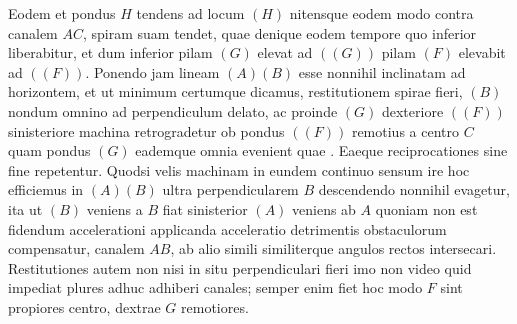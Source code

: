 \noindent {} 
\pend
\vspace{1.5em}
\pstart
Eodem
et pondus $H$ tendens ad locum $(H)$ nitensque eodem modo contra canalem $AC$, spiram suam tendet,
quae denique eodem tempore quo inferior liberabitur,
et dum inferior pilam\protect{} $(G)$ elevat ad $((G))$ pilam $(F)$ elevabit ad $((F))$.
\pend 
\pstart
Ponendo jam lineam $(A)(B)$ esse nonnihil inclinatam ad horizontem, et ut minimum certumque dicamus, restitutionem spirae fieri, $(B)$ nondum omnino ad perpendiculum delato, ac proinde $(G)$ dexteriore $((F))$ sinisteriore machina retrogradetur ob pondus $((F))$ remotius a centro $C$ quam pondus $(G)$ eademque omnia evenient quae . Eaeque reciprocationes sine fine repetentur. Quodsi velis machinam in eundem continuo sensum ire hoc efficiemus  in $(A)(B)$ ultra perpendicularem $B$ descendendo nonnihil evagetur, ita ut $(B)$ veniens a $B$ fiat sinisterior $(A)$ veniens ab $A$  quoniam non est fidendum accelerationi\protect{} 
applicanda
 acceleratio detrimentis obstaculorum compensatur,  canalem $AB$, ab alio simili similiterque  angulos rectos intersecari. Restitutiones autem non nisi in situ perpendiculari fieri imo non video quid impediat plures adhuc adhiberi canales; semper enim fiet hoc modo  $F$ sint propiores centro, dextrae $G$ remotiores.
